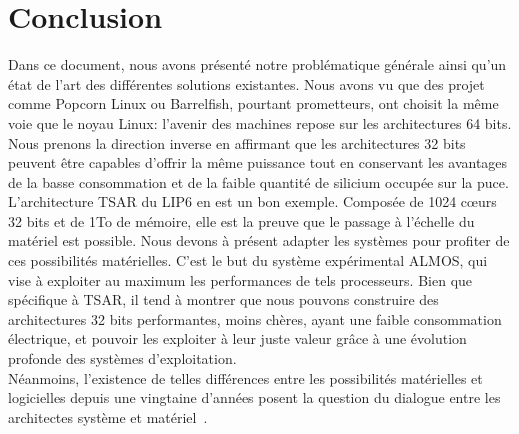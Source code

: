 \chapter{Conclusion}
\label{sec:conclusion}

  Dans ce document, nous avons présenté notre problématique générale ainsi qu'un
  état de l'art des différentes solutions existantes. Nous avons vu que des
  projet comme Popcorn Linux ou Barrelfish, pourtant prometteurs, ont choisit la
  même voie que le noyau Linux: l'avenir des machines repose sur les
  architectures 64 bits. Nous prenons la direction inverse en affirmant que les
  architectures 32 bits peuvent être capables d'offrir la même puissance tout en
  conservant les avantages de la basse consommation et de la faible quantité de
  silicium occupée sur la puce.\\

  L'architecture TSAR du LIP6 en est un bon exemple. Composée de 1024 c\oe urs
  32 bits et de 1To de mémoire, elle est la preuve que le passage à l'échelle du
  matériel est possible. Nous devons à présent adapter les systèmes pour
  profiter de ces possibilités matérielles. C'est le but du système expérimental
  ALMOS, qui vise à exploiter au maximum les performances de tels
  processeurs. Bien que spécifique à TSAR, il tend à montrer que nous pouvons
  construire des architectures 32 bits performantes, moins chères, ayant une
  faible consommation électrique, et pouvoir les exploiter à leur juste valeur
  grâce à une évolution profonde des systèmes d'exploitation.\\

  Néanmoins, l'existence de telles différences entre les possibilités
  matérielles et logicielles depuis une vingtaine d'années posent la question du
  dialogue entre les architectes système et matériel~\citep{mogul2011mind}.
